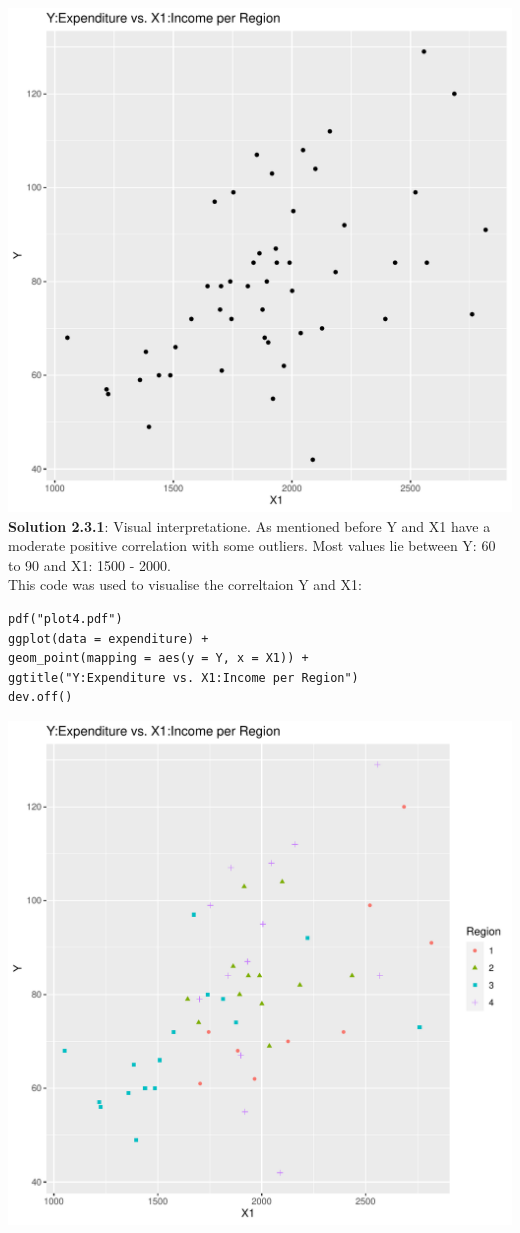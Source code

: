 \documentclass[12pt,letterpaper]{article}
\begin{document}
\includegraphics[width=.50\textwidth]{plot4.pdf} \\
\textbf{Solution 2.3.1}: Visual interpretatione. As mentioned before Y and X1 have a moderate positive correlation with some outliers. Most values lie between Y: 60 to 90 and X1: 1500 - 2000.\\

This code was used to visualise the correltaion Y and X1:
\begin{verbatim}
pdf("plot4.pdf")
ggplot(data = expenditure) +  
geom_point(mapping = aes(y = Y, x = X1)) +  
ggtitle("Y:Expenditure vs. X1:Income per Region")
dev.off()
\end{verbatim}

\includegraphics[width=.85\textwidth]{plot5.pdf} \\
\end{document}
